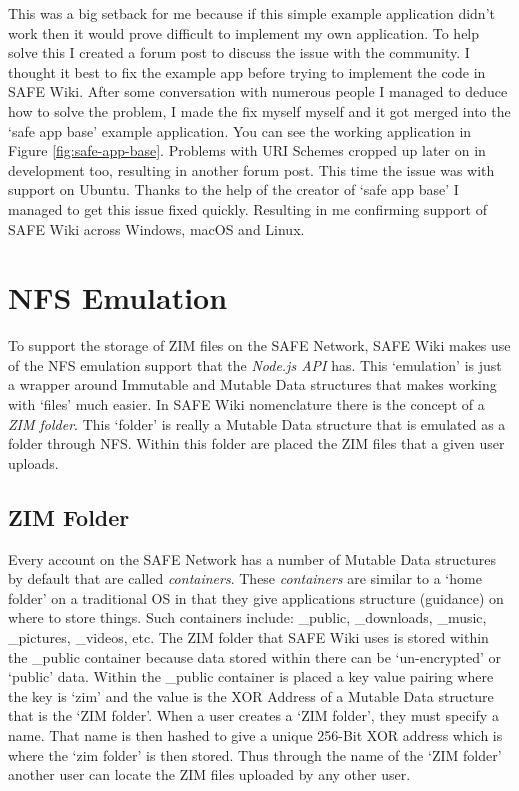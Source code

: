 This was a big setback for me because if this simple example application didn't work then it would prove difficult to implement my own application. To help solve this I created a forum post\cite{safe-app-base-forummacfix} to discuss the issue with the community. I thought it best to fix the example app before trying to implement the code in SAFE Wiki. After some conversation with numerous people I managed to deduce how to solve the problem, I made the fix myself myself\cite{safe-app-base-fix} and it got merged into the `safe app base' example application. You can see the working application in Figure \ref{fig:safe-app-base}. Problems with URI Schemes cropped up later on in development too, resulting in another forum post\cite{uri-scheme-ubuntu}. This time the issue was with support on Ubuntu. Thanks to the help of the creator of `safe app base' I managed to get this issue fixed quickly. Resulting in me confirming support of SAFE Wiki across Windows, macOS and Linux.

\section{NFS Emulation}

To support the storage of ZIM files on the SAFE Network, SAFE Wiki makes use of the NFS emulation support that the \textit{Node.js API} has. This `emulation' is just a wrapper around Immutable and Mutable Data structures that makes working with `files' much easier. In SAFE Wiki nomenclature there is the concept of a \textit{ZIM folder}. This `folder' is really a Mutable Data structure that is emulated as a folder through NFS. Within this folder are placed the ZIM files that a given user uploads.

\subsection{ZIM Folder}

Every account on the SAFE Network has a number of Mutable Data structures by default that are called \textit{containers}. These \textit{containers} are similar to a `home folder' on a traditional OS in that they give applications structure (guidance) on where to store things. Such containers include: \_public, \_downloads, \_music, \_pictures, \_videos, etc. The ZIM folder that SAFE Wiki uses is stored within the \_public container because data stored within there can be `un-encrypted' or `public' data. Within the \_public container is placed a key value pairing where the key is `zim' and the value is the XOR Address of a Mutable Data structure that is the `ZIM folder'. When a user creates a `ZIM folder', they must specify a name. That name is then hashed to give a unique 256-Bit XOR address which is where the `zim folder' is then stored. Thus through the name of the `ZIM folder' another user can locate the ZIM files uploaded by any other user.

